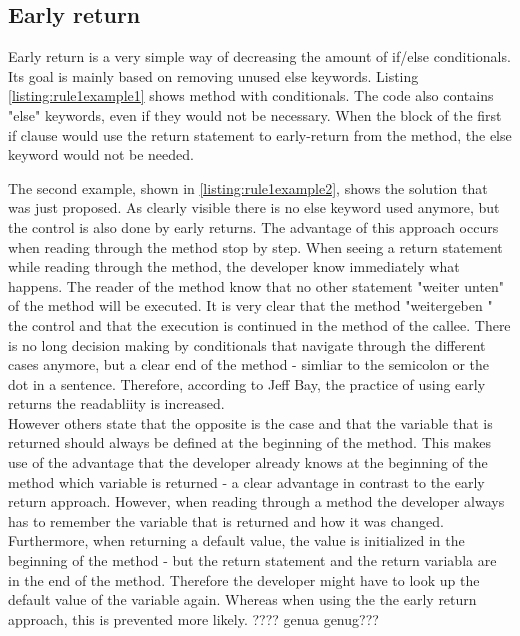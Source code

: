 \subsection*{Early return}
Early return is a very simple way of decreasing the amount of if/else conditionals. Its goal is mainly based on removing unused else keywords. Listing \ref{listing:rule1example1} shows method with conditionals. The code also contains "else" keywords, even if they would not be necessary. When the block of the first if clause would use the return statement to early-return from the method, the else keyword would not be needed.

\label{listing:rule1example1}

\label{listing:rule1example2}
The second example, shown in \ref{listing:rule1example2}, shows the solution that was just proposed. As clearly visible there is no else keyword used anymore, but the control is also done by early returns. The advantage of this approach occurs when reading through the method stop by step. When seeing a return statement while reading through the method, the developer know immediately what happens. The reader of the method know that no other statement "weiter unten" of the method will be executed. It is very clear that the method "weitergeben " the control and that the execution is continued in the method of the callee. There is no long decision making by conditionals that navigate through the different cases anymore, but a clear end of the method - simliar to the semicolon or the dot in a sentence. Therefore, according to Jeff Bay, the practice of using early returns the readabliity is increased. \\

However others state that the opposite is the case and that the variable that is returned should always be defined at the beginning of the method. This makes use of the advantage that the developer already knows at the beginning of the method which variable is returned - a clear advantage in contrast to the early return approach. However, when reading through a method the developer always has to remember the variable that is returned and how it was changed. Furthermore, when returning a default value, the value is initialized in the beginning of the method - but the return statement and the return variabla are in the end of the method. Therefore the developer might have to look up the default value of the variable again. Whereas when using the the early return approach, this is prevented more likely. ???? genua genug???
\\

